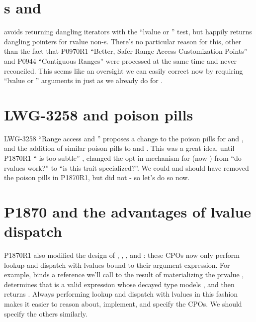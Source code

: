 \section{s and }

 avoids returning dangling iterators
with the ``lvalue or '' test,
but  happily returns dangling pointers for rvalue non-s.
There's no particular reason for this, other than the fact that
P0970R1 ``Better, Safer Range Access Customization Points'' \cite{p0970r1} and
P0944 ``Contiguous Ranges'' \cite{p0944r0}
were processed at the same time and never reconciled.
This seems like an oversight we can easily correct now
by requiring ``lvalue or '' arguments
in  just as we already do for .


\section{LWG-3258 and poison pills}

LWG-3258 ``Range access and '' \cite{lwg3258}
proposes a change to the  poison pills
for  and , and
the addition of similar poison pills to  and .
This was a great idea, until
P1870R1 `` is too subtle'' \cite{p1870r1},
changed the opt-in mechanism for 
(now ) from ``do rvalues work?''
to ``is this trait specialized?''.
We could and should have removed the  poison pills
in P1870R1, but did not - so let's do so now.


\section{P1870 and the advantages of lvalue dispatch}

P1870R1 also modified the design of
, , , and :
these CPOs now only perform lookup and dispatch
with lvalues bound to their argument expression.
For example,  binds
a reference we'll call  to the result of materializing
the prvalue ,
determines that  is a valid expression
whose decayed type models ,
and then returns .
Always performing lookup and dispatch with lvalues in this fashion
makes it easier to reason about, implement, and specify the CPOs.
We should specify the others similarly.


